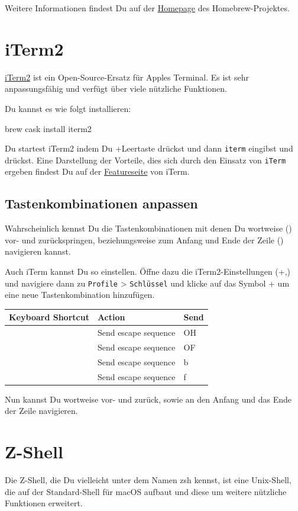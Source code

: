 \documentclass[]{article}
\newcommand{\code}[1]{\texttt{#1}}
\begin{document}
Weitere Informationen findest Du auf der \href{https://brew.sh/index_de}{Homepage} des Homebrew-Projektes.

\section{iTerm2}
\href{https://www.iterm2.com/}{iTerm2} ist ein Open-Source-Ersatz für Apples Terminal. Es ist sehr anpassungsfähig und verfügt über viele nützliche Funktionen.

Du kannst es wie folgt installieren:
\begin{bashcode}
brew cask install iterm2
\end{bashcode}

Du startest iTerm2 indem Du \cmdkey+Leertaste drückst und dann \code{iterm} eingibst und \returnkey\, drückst. Eine Darstellung der Vorteile, dies sich durch den Einsatz von \code{iTerm} ergeben findest Du auf der \href{https://www.iterm2.com/features.html}{Featureseite} von iTerm.

\subsection{Tastenkombinationen anpassen}
Wahrscheinlich kennst Du die Tastenkombinationen mit denen Du wortweise (\optkey) vor- und zurückspringen, beziehungsweise zum Anfang und Ende der Zeile (\cmdkey) navigieren kannst.

Auch iTerm kannst Du so einstellen. Öffne dazu die iTerm2-Einstellungen (\cmdkey +,) und navigiere dann zu \code{Profile} > \code{Schlüssel} und klicke  auf das Symbol +  um eine neue Tastenkombination hinzufügen.

\begin{tabular}[t]{lll}
	\toprule
	Keyboard Shortcut & Action & Send \\
	\midrule
	\cmdkey \textleftarrow & Send escape sequence & OH \\
	\cmdkey \textrightarrow & Send escape sequence & OF \\
	\optkey \textleftarrow & Send escape sequence & b \\
	\optkey \textrightarrow & Send escape sequence & f \\
\end{tabular}

Nun kannst Du wortweise vor- und zurück, sowie an den Anfang und das Ende der Zeile navigieren.

\section{Z-Shell}
Die Z-Shell, die Du vielleicht unter dem Namen zsh kennst, ist eine Unix-Shell, die auf der Standard-Shell für macOS aufbaut und diese um weitere nützliche Funktionen erweitert. 
\end{document}
